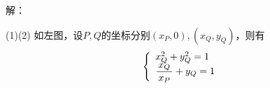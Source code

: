 解：
\begin{center}
	\quad
\end{center}
(1)(2) 如左图，设$P,Q$的坐标分别$(x_P,0),(x_Q,y_Q)$，则有
$$
\left\{
\begin{array}{l}
	x^2_Q+y^2_Q=1\\
	\displaystyle\frac{\,{x_Q}\,}{\,{x_P}\,}+y_Q=1
\end{array}
\right.
$$
